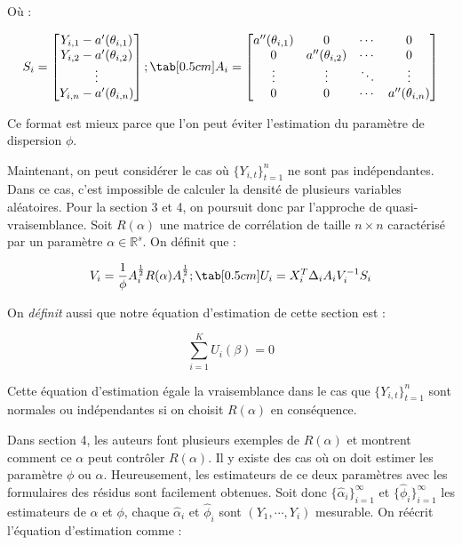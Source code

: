 \documentclass[../main.tex]{subfiles}
\begin{document}
Où :

\begin{equation*}
    S_i = 
    \begin{bmatrix}
        Y_{i,1} - a'(\theta_{i,1}) \\
        Y_{i,2} - a'(\theta_{i,2}) \\
        \vdots \\
        Y_{i,n} - a'(\theta_{i,n})
    \end{bmatrix}; \tab[0.5cm]
    A_i = 
    \begin{bmatrix}
        a''(\theta_{i,1}) & 0 & \cdots & 0 \\
        0 & a''(\theta_{i,2}) & \cdots & 0 \\
        \vdots & \vdots & \ddots & \vdots \\
        0 & 0 & \cdots & a''(\theta_{i,n})
    \end{bmatrix}
\end{equation*}

Ce format est mieux parce que l'on peut éviter l'estimation du paramètre de dispersion $\phi$.

Maintenant, on peut considérer le cas où $\{Y_{i,t}\}_{t=1}^n$ ne sont pas indépendantes.
Dans ce cas, c'est impossible de calculer la densité de plusieurs variables aléatoires.
Pour la section 3 et 4, on poursuit donc par l'approche de quasi-vraisemblance. 
Soit $R(\alpha)$ une matrice de corrélation de taille $n \times n$ caractérisé par un paramètre $\alpha \in \mathbb{R}^s$.
On définit que :

\begin{equation*}
    V_i = \frac{1}{\phi} A_i^{\frac{1}{2}} R(\alpha) A_i^{\frac{1}{2}} ; \tab[0.5cm] U_i = X_i^T \Delta_i A_i V_i^{-1} S_i
\end{equation*}

On \textit{définit} aussi que notre équation d'estimation de cette section est :

\begin{equation*}
    \sum_{i=1}^K U_i(\beta) = 0
\end{equation*}

Cette équation d'estimation égale la vraisemblance dans le cas que $\{Y_{i,t}\}_{t=1}^n$ sont normales ou indépendantes
si on choisit $R(\alpha)$ en conséquence.

Dans section 4, les auteurs font plusieurs exemples de $R(\alpha)$ et montrent comment ce $\alpha$ peut 
contrôler $R(\alpha)$. Il y existe des cas où on doit estimer les paramètre $\phi$ ou $\alpha$. 
Heureusement, les estimateurs de ce deux paramètres avec les formulaires des résidus sont facilement obtenues.
Soit donc $\{\hat{\alpha}_i\}_{i=1}^{\infty}$ et $\{\hat{\phi}_i\}_{i=1}^{\infty}$ les estimateurs de $\alpha$ et $\phi$,
chaque $\hat{\alpha}_i$ et $\hat{\phi}_i$ sont $(Y_1, \cdots, Y_i)$ mesurable. 
On réécrit l'équation d'estimation comme :
\end{document}
